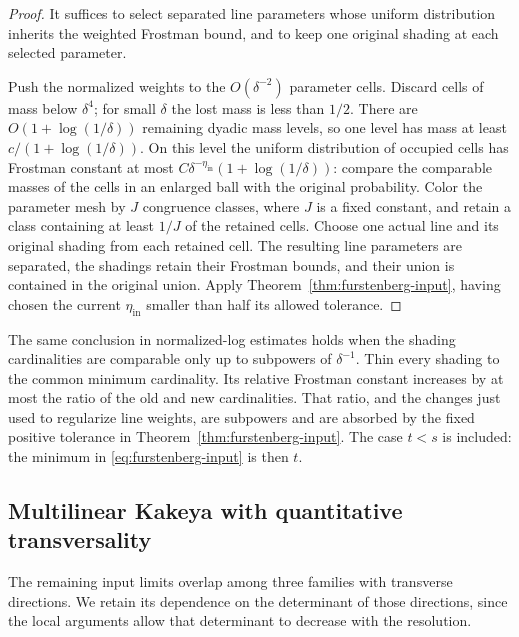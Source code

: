 \begin{proof}
It suffices to select separated line parameters whose uniform
distribution inherits the weighted Frostman bound, and to keep one
original shading at each selected parameter.

Push the normalized weights to the $O(\delta^{-2})$ parameter cells.
Discard cells of mass below $\delta^4$; for small $\delta$ the lost
mass is less than $1/2$. There are $O(1+\log(1/\delta))$ remaining
dyadic mass levels, so one level has mass at least
$c/(1+\log(1/\delta))$. On this level the uniform distribution of
occupied cells has Frostman constant at most
$C\delta^{-\eta_{\mathrm{in}}}(1+\log(1/\delta))$: compare the comparable masses
of the cells in an enlarged ball with the original probability.
Color the parameter mesh by $J$ congruence classes, where $J$ is
a fixed constant, and retain a class containing at least $1/J$
of the retained cells. Choose one actual line
and its original shading from each retained cell. The resulting
line parameters are separated, the shadings retain their Frostman
bounds, and their union is contained in the original union.
Apply Theorem~\ref{thm:furstenberg-input}, having chosen the current
$\eta_{\mathrm{in}}$ smaller than half its allowed tolerance.
\end{proof}

\begin{remark}\label{rem:input-subpower-shadings}
The same conclusion in normalized-log estimates holds when the
shading cardinalities are comparable only up to subpowers of
$\delta^{-1}$. Thin every shading to the common minimum cardinality.
Its relative Frostman constant increases by at most the ratio of
the old and new cardinalities. That ratio, and the changes just
used to regularize line weights, are subpowers and are absorbed by
the fixed positive tolerance in Theorem~\ref{thm:furstenberg-input}.
The case $t<s$ is included: the minimum in
\eqref{eq:furstenberg-input} is then $t$.
\end{remark}

\subsection{Multilinear Kakeya with quantitative transversality}

The remaining input limits overlap among three families with transverse
directions. We retain its dependence on the determinant of those
directions, since the local arguments allow that determinant to decrease
with the resolution.

